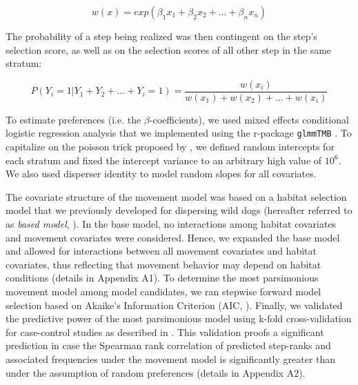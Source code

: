 \documentclass[abstract=on,10pt,a4paper,bibliography=totocnumbered]{article}
\begin{document}
\begin{equation}
\label{EQ1}
  w(x) = exp(\beta_1 x_1 + \beta_2 x_2 + ... + \beta_n x_n)
\end{equation}

\noindent The probability of a step being realized was then contingent on the
step's selection score, as well as on the selection scores of all other step in
the same stratum:

\begin{equation}
\label{EQ2}
  P(Y_{i} = 1 | Y_{1} + Y_{2} + ... + Y_{i} = 1) =
  \frac{w(x_{i})}{w(x_{1}) + w(x_{2}) + ... + w(x_{i})}
\end{equation}

\noindent To estimate preferences (i.e. the \(\beta\)-coefficients), we used
mixed effects conditional logistic regression analysis \citep{Muff.2020} that we
implemented using the r-package {\tt glmmTMB} \citep{Brooks.2017}. To capitalize
on the poisson trick proposed by \cite{Muff.2020}, we defined random intercepts
for each stratum and fixed the intercept variance to an arbitrary high value of
\(10 ^ 6\). We also used disperser identity to model random slopes for all
covariates.

The covariate structure of the movement model was based on a habitat selection
model that we previously developed for dispersing wild dogs (hereafter referred
to as \textit{based model}, \citealp{Hofmann.2021}). In the base model, no
interactions among habitat covariates and movement covariates were considered.
Hence, we expanded the base model and allowed for interactions between all
movement covariates and habitat covariates, thus reflecting that movement
behavior may depend on habitat conditions (details in Appendix A1). To determine
the most parsimonious movement model among model candidates, we ran stepwise
forward model selection based on Akaike's Information Criterion (AIC,
\citealp{Burnham.2002}). Finally, we validated the predictive power of the most
parsimonious model using k-fold cross-validation for case-control studies as
described in \cite{Fortin.2009}. This validation proofs a significant prediction
in case the Spearman rank correlation of predicted step-ranks and associated
frequencies under the movement model is significantly greater than under the
assumption of random preferences (details in Appendix A2).
\end{document}

